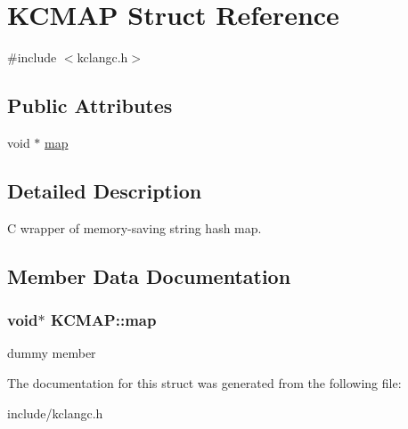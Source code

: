 \hypertarget{structKCMAP}{\section{\-K\-C\-M\-A\-P \-Struct \-Reference}
\label{structKCMAP}
}


{\ttfamily \#include $<$kclangc.\-h$>$}

\subsection*{\-Public \-Attributes}
\begin{DoxyCompactItemize}
\item 
void $\ast$ \hyperlink{structKCMAP_a030ea96ece49f0fe55112e1edcb87b40}{map}
\end{DoxyCompactItemize}


\subsection{\-Detailed \-Description}
\-C wrapper of memory-\/saving string hash map. 

\subsection{\-Member \-Data \-Documentation}
\hypertarget{structKCMAP_a030ea96ece49f0fe55112e1edcb87b40}{
\subsubsection[{map}]{\setlength{\rightskip}{0pt plus 5cm}void$\ast$ {\bf \-K\-C\-M\-A\-P\-::map}}}\label{structKCMAP_a030ea96ece49f0fe55112e1edcb87b40}
dummy member 

\-The documentation for this struct was generated from the following file\-:\begin{DoxyCompactItemize}
\item 
include/kclangc.\-h\end{DoxyCompactItemize}

